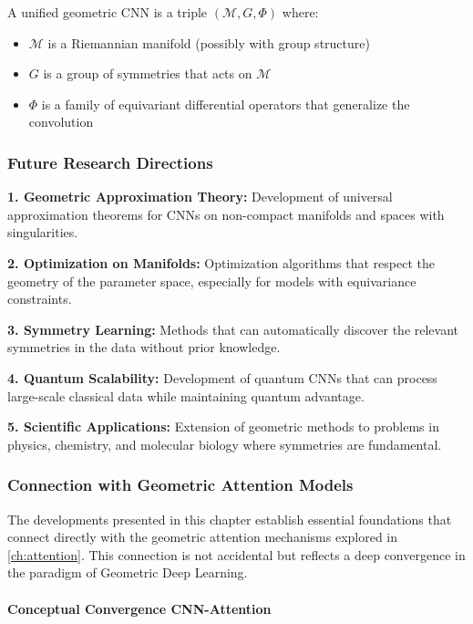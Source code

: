 \begin{definition}
A unified geometric CNN is a triple $(\mathcal{M}, G, \Phi)$ where:
\begin{itemize}
\item $\mathcal{M}$ is a Riemannian manifold (possibly with group structure)
\item $G$ is a group of symmetries that acts on $\mathcal{M}$
\item $\Phi$ is a family of equivariant differential operators that generalize the convolution
\end{itemize}
\end{definition}

\subsubsection{Future Research Directions}

\textbf{1. Geometric Approximation Theory:} Development of universal approximation theorems for CNNs on non-compact manifolds and spaces with singularities.

\textbf{2. Optimization on Manifolds:} Optimization algorithms that respect the geometry of the parameter space, especially for models with equivariance constraints.

\textbf{3. Symmetry Learning:} Methods that can automatically discover the relevant symmetries in the data without prior knowledge.

\textbf{4. Quantum Scalability:} Development of quantum CNNs that can process large-scale classical data while maintaining quantum advantage.

\textbf{5. Scientific Applications:} Extension of geometric methods to problems in physics, chemistry, and molecular biology where symmetries are fundamental.

\subsubsection{Connection with Geometric Attention Models}

The developments presented in this chapter establish essential foundations that connect directly with the geometric attention mechanisms explored in \autoref{ch:attention}. This connection is not accidental but reflects a deep convergence in the paradigm of Geometric Deep Learning.

\paragraph{Conceptual Convergence CNN-Attention}

